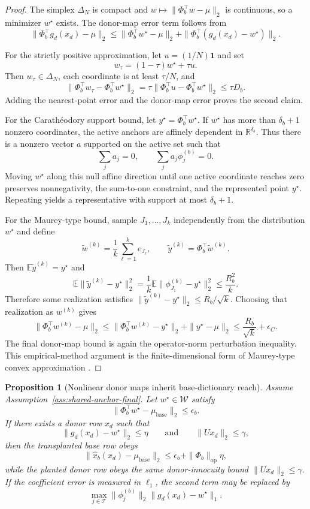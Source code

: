 \documentclass{article}
\theoremstyle{plain}
\newtheorem{proposition}[theorem]{Proposition}
\theoremstyle{definition}
\theoremstyle{remark}
\begin{document}
\begin{proof}
The simplex $\Delta_N$ is compact and $w\mapsto\|\Phi_b^\top w-
\mu\|_2$ is continuous, so a minimizer $w^\star$ exists. The donor-map error term follows from
\[
\|\Phi_b^\top g_d(x_d)-\mu\|_2
\le
\|\Phi_b^\top w^\star-\mu\|_2
+
\|\Phi_b^\top(g_d(x_d)-w^\star)\|_2.
\]

For the strictly positive approximation, let $u=(1/N)\mathbf{1}$ and set
\[
w_\tau=(1-\tau)w^\star+\tau u.
\]
Then $w_\tau\in\Delta_N$, each coordinate is at least $\tau/N$, and
\[
\|\Phi_b^\top w_\tau-\Phi_b^\top w^\star\|_2
=
\tau\|\Phi_b^\top u-\Phi_b^\top w^\star\|_2
\le
\tau D_b.
\]
Adding the nearest-point error and the donor-map error proves the second claim.

For the Carath\'eodory support bound, let $y^\star=\Phi_b^\top w^\star$. If $w^\star$ has more than $\delta_b+1$ nonzero coordinates, the active anchors are affinely dependent in $\mathbb{R}^{\delta_b}$. Thus there is a nonzero vector $a$ supported on the active set such that
\[
\sum_j a_j=0,
\qquad
\sum_j a_j\phi_j^{(b)}=0.
\]
Moving $w^\star$ along this null affine direction until one active coordinate reaches zero preserves nonnegativity, the sum-to-one constraint, and the represented point $y^\star$. Repeating yields a representative with support at most $\delta_b+1$.

For the Maurey-type bound, sample $J_1,\ldots,J_k$ independently from the distribution $w^\star$ and define
\[
\widetilde{w}^{(k)}=\frac{1}{k}\sum_{\ell=1}^{k}e_{J_\ell},
\qquad
\widetilde{y}^{(k)}=\Phi_b^\top\widetilde{w}^{(k)}.
\]
Then $\mathbb{E}\widetilde{y}^{(k)}=y^\star$ and
\[
\mathbb{E}\|\widetilde{y}^{(k)}-y^\star\|_2^2
=
\frac{1}{k}\mathbb{E}\|\phi_{J_1}^{(b)}-y^\star\|_2^2
\le
\frac{R_b^2}{k}.
\]
Therefore some realization satisfies $\|\widetilde{y}^{(k)}-y^\star\|_2\le R_b/\sqrt{k}$. Choosing that realization as $w^{(k)}$ gives
\[
\|\Phi_b^\top w^{(k)}-\mu\|_2
\le
\|\Phi_b^\top w^{(k)}-y^\star\|_2+
\|y^\star-\mu\|_2
\le
\frac{R_b}{\sqrt{k}}+\epsilon_C.
\]
The final donor-map bound is again the operator-norm perturbation inequality. This empirical-method argument is the finite-dimensional form of Maurey-type convex approximation \citep{maureypisier1981,barron1993universal}.
\end{proof}

\begin{proposition}[Nonlinear donor maps inherit base-dictionary reach]
\label{prop:nonlinear-map-error}
Assume Assumption~\ref{ass:shared-anchor-final}. Let $w^\star\in\mathcal{W}$ satisfy
\[
\|\Phi_b^\top w^\star-\mu_{\mathrm{base}}\|_2\le \epsilon_b.
\]
If there exists a donor row $x_d$ such that
\[
\|g_d(x_d)-w^\star\|_2\le \eta
\qquad
\text{and}
\qquad
\|Ux_d\|_2\le \gamma,
\]
then the transplanted base row obeys
\[
\|\widehat{x}_b(x_d)-\mu_{\mathrm{base}}\|_2
\le
\epsilon_b+
\|\Phi_b\|_{\mathrm{op}}\eta,
\]
while the planted donor row obeys the same donor-innocuity bound $\|Ux_d\|_2\le\gamma$. If the coefficient error is measured in $\ell_1$, the second term may be replaced by
\[
\max_{j\in\mathcal{T}}\|\phi_j^{(b)}\|_2\|g_d(x_d)-w^\star\|_1.
\]
\end{proposition}
\end{document}
